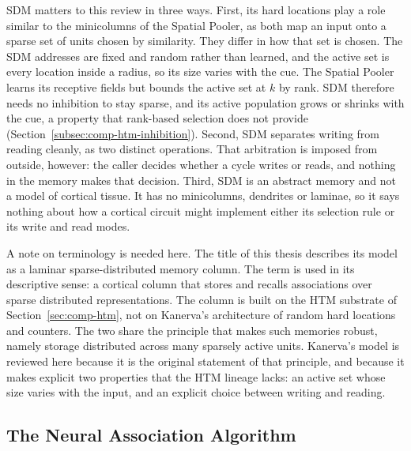 SDM matters to this review in three ways. First, its hard locations play a
role similar to the minicolumns of the Spatial Pooler, as both map an input
onto a sparse set of units chosen by similarity. They differ in how that set
is chosen. The SDM addresses are fixed and random rather than learned, and the
active set is every location inside a radius, so its size varies with the cue.
The Spatial Pooler learns its receptive fields but bounds the active set at
$k$ by rank. SDM therefore needs no inhibition to stay sparse, and its
active population grows or shrinks with the cue, a property that rank-based
selection does not provide (Section~\ref{subsec:comp-htm-inhibition}). Second,
SDM separates writing from reading cleanly, as two distinct operations. That
arbitration is imposed from outside, however: the caller decides whether a
cycle writes or reads, and nothing in the memory makes that decision. Third,
SDM is an abstract memory and not a model of cortical tissue. It has no
minicolumns, dendrites or laminae, so it says nothing about how a cortical
circuit might implement either its selection rule or its write and read modes.

A note on terminology is needed here. The title of this thesis describes its
model as a laminar sparse-distributed memory column. The term is used in its
descriptive sense: a cortical column that stores and recalls associations over
sparse distributed representations. The column is built on the HTM substrate
of Section~\ref{sec:comp-htm}, not on Kanerva's architecture of random hard
locations and counters. The two share the principle that makes such memories
robust, namely storage distributed across many sparsely active units.
Kanerva's model is reviewed here because it is the original statement of that
principle, and because it makes explicit two properties that the HTM lineage
lacks: an active set whose size varies with the input, and an explicit choice
between writing and reading.

\subsection{The Neural Association Algorithm}
\label{subsec:comp-naa}

